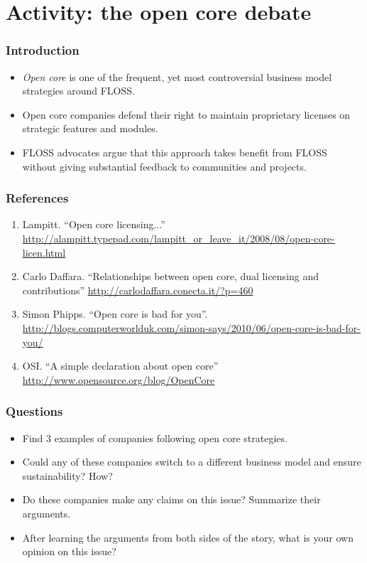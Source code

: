 
\section{Activity: the open core debate}

\begin{frame}
\frametitle{Introduction}
\begin{itemize}
  \item \textit{Open core} is one of the frequent, yet most controversial
business model strategies around FLOSS.
  \item Open core companies defend their right to maintain proprietary licenses
on strategic features and modules.
  \item FLOSS advocates argue that this approach takes benefit from FLOSS without
giving substantial feedback to communities and projects.
\end{itemize}
\end{frame}

\begin{frame}
 \frametitle{References}
 
 \begin{enumerate}
 \item Lampitt. ``Open core licensing...''
   \footnotesize{\url{http://alampitt.typepad.com/lampitt_or_leave_it/2008/08/open-core-licen.html}}
 \item Carlo Daffara. ``Relationships between open core, dual licensing and contributions''
   \url{http://carlodaffara.conecta.it/?p=460}
 \item Simon Phipps. ``Open core is bad for you''.
   \footnotesize{\url{http://blogs.computerworlduk.com/simon-says/2010/06/open-core-is-bad-for-you/}}
 \item OSI. ``A simple declaration about open core''
   \url{http://www.opensource.org/blog/OpenCore}
 \end{enumerate}
 
\end{frame}

\begin{frame}
 \frametitle{Questions}
 \begin{itemize}
  \item Find 3 examples of companies following open core strategies.
  \item Could any of these companies switch to a different business model
  and ensure sustainability? How?
  \item Do these companies make any claims on this issue? Summarize
  their arguments.
  \item After learning the arguments from both sides of the story, what is your
  own opinion on this issue?
 \end{itemize}

\end{frame}




